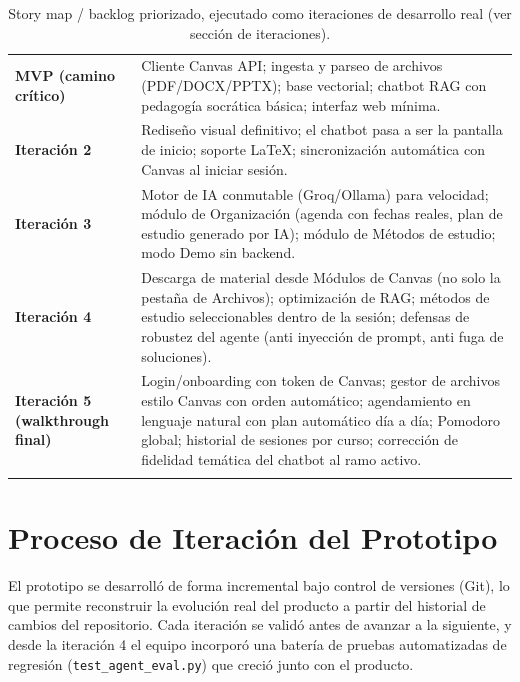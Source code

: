 \documentclass[11pt,a4paper]{article}
\begin{document}
\begin{longtable}{@{}>{\bfseries}p{3cm} p{11.5cm}@{}}
\toprule
MVP (camino cr\'itico) & Cliente Canvas API; ingesta y parseo de archivos (PDF/DOCX/PPTX); base vectorial; chatbot RAG con pedagog\'ia socr\'atica b\'asica; interfaz web m\'inima. \\
Iteraci\'on 2 & Redise\~no visual definitivo; el chatbot pasa a ser la pantalla de inicio; soporte LaTeX; sincronizaci\'on autom\'atica con Canvas al iniciar sesi\'on. \\
Iteraci\'on 3 & Motor de IA conmutable (Groq/Ollama) para velocidad; m\'odulo de Organizaci\'on (agenda con fechas reales, plan de estudio generado por IA); m\'odulo de M\'etodos de estudio; modo Demo sin backend. \\
Iteraci\'on 4 & Descarga de material desde M\'odulos de Canvas (no solo la pesta\~na de Archivos); optimizaci\'on de RAG; m\'etodos de estudio seleccionables dentro de la sesi\'on; defensas de robustez del agente (anti inyecci\'on de prompt, anti fuga de soluciones). \\
Iteraci\'on 5 (walkthrough final) & Login/onboarding con token de Canvas; gestor de archivos estilo Canvas con orden autom\'atico; agendamiento en lenguaje natural con plan autom\'atico d\'ia a d\'ia; Pomodoro global; historial de sesiones por curso; correcci\'on de fidelidad tem\'atica del chatbot al ramo activo. \\
\bottomrule
\caption{Story map / backlog priorizado, ejecutado como iteraciones de desarrollo real (ver secci\'on de iteraciones).}
\end{longtable}

\section{Proceso de Iteraci\'on del Prototipo}

El prototipo se desarroll\'o de forma incremental bajo control de versiones (Git), lo que permite reconstruir la evoluci\'on real del producto a partir del historial de cambios del repositorio. Cada iteraci\'on se valid\'o antes de avanzar a la siguiente, y desde la iteraci\'on 4 el equipo incorpor\'o una bater\'ia de pruebas automatizadas de regresi\'on (\texttt{test\_agent\_eval.py}) que creci\'o junto con el producto.
\end{document}
